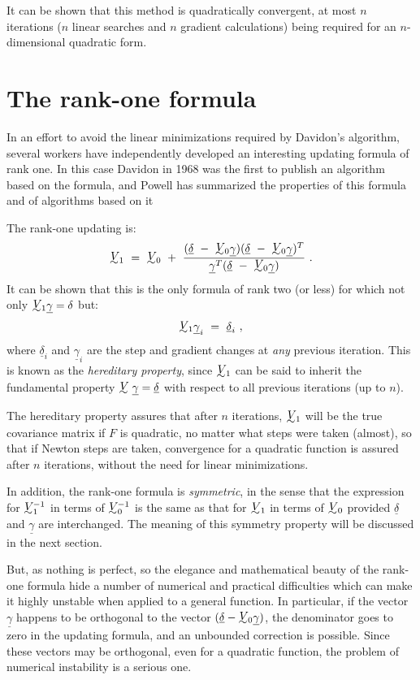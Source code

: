      It can be shown that this method is quadratically convergent, at
most $n$ iterations ($n$ linear searches and $n$ gradient calculations) being
required for an $n$-dimensional quadratic form.
 
 
\section{The rank-one formula}
 
     In an effort to avoid the linear minimizations required by Davidon's
algorithm, several workers have independently developed an interesting
updating formula of rank one.  In this case Davidon in 1968 was the
first
to publish an algorithm \cite{Davi} based on the formula, and Powell \cite{Powe2} has
summarized the properties of this formula and of algorithms based on it
 
     The rank-one updating is:
$$\UTV\!\!_1~=~\UTV\!\!_0~+~{({\underline{\delta}}~-~\UTV\!\!_0{\underline{\gamma}})
({\underline{\delta}}~-~\UTV\!\!_0{\underline{\gamma}})^T\over
{\underline{\gamma}}^T({\underline{\delta}}~-~\UTV\!\!_0{\underline{\gamma}})}~.$$
It can be shown \cite{Powe2} that this is the only formula of rank two (or less)
for which not only $\UTV\!\!_1{\underline{\gamma}} = \delta$ but:
$$\UTV\!\!_1{\underline{\gamma}}_i~=~{\underline{\delta}}_i~,$$
 where ${\underline{\delta}}_i$ and ${\underline{\gamma}}_i$ are the step
 and gradient changes at {\em any} previous
iteration.  This is known as the {\em hereditary property}, since $\UTV\!\!_1$ can be
said to
inherit the fundamental property $\UTV{\underline{\gamma}} = {\underline{\delta}}$  with respect
to all previous iterations (up to $n$).
 
     The hereditary property assures that after $n$ iterations, $\UTV\!\!_1$ will be
the true covariance matrix if $F$ is quadratic, no matter what steps were
taken (almost), so that if Newton steps are taken, convergence for a
quadratic function is assured after $n$ iterations, without the need for
linear minimizations.
 
     In addition, the rank-one formula is {\em symmetric}, in the sense that
the expression for $\UTV\!\!_1^{-1}$ in terms of $\UTV\!\!_0^{-1}$ is the same as that for
$\UTV\!\!_1$ in terms of $\UTV\!\!_0$ provided ${\underline{\delta}}$ and ${\underline{\gamma}}$ are
interchanged. The meaning of this symmetry property will be discussed in the next section.
 
     But, as nothing is perfect, so the elegance and mathematical beauty
of the rank-one formula hide a number of numerical and practical difficulties which can make it highly unstable when applied to a general
function.  In particular, if the vector ${\underline{\gamma}}$ happens to be orthogonal to the
vector $({\underline{\delta}}- \UTV\!\!_0{\underline{\gamma}})$, the denominator goes to zero in
the updating formula, and an unbounded correction is possible.  Since these vectors may be
orthogonal, even for a quadratic function, the problem of numerical
instability is a serious one.
 
